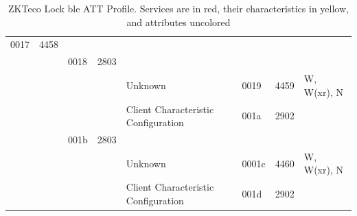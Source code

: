 \documentclass[conference]{IEEEtran}
\begin{document}
\begin{landscape}
\begin{table}[ht]
\begin{tabular}{@{}llllllll@{}}
{\color[HTML]{000000} 0017} & {\color[HTML]{000000} 4458} & {\color[HTML]{000000} }      & {\color[HTML]{000000} }      & {\color[HTML]{000000} }                                                                & {\color[HTML]{000000} }  & {\color[HTML]{000000} }          & {\color[HTML]{000000} }                                                                                            \\
                            &                             & \cellcolor[HTML]{FFFE65}0018 & \cellcolor[HTML]{FFFE65}2803 & \cellcolor[HTML]{FFFE65}                                                               & \cellcolor[HTML]{FFFE65} & \cellcolor[HTML]{FFFE65}         & \cellcolor[HTML]{FFFE65}                                                                                           \\
                            &                             &                              &                              & Unknown                                                                                & 0019                     & 4459                             & W, W(xr), N                                                                                                        \\
                            &                             &                              &                              & Client Characteristic Configuration                                                    & 001a                     & 2902                             &                                                                                                                    \\
                            &                             & \cellcolor[HTML]{FFFE65}001b & \cellcolor[HTML]{FFFE65}2803 & \cellcolor[HTML]{FFFE65}                                                               & \cellcolor[HTML]{FFFE65} & \cellcolor[HTML]{FFFE65}         & \cellcolor[HTML]{FFFE65}                                                                                           \\
                            &                             &                              &                              & Unknown                                                                                & 0001c                    & 4460                             & W, W(xr), N                                                                                                        \\
                            &                             &                              &                              & Client Characteristic Configuration                                                    & 001d                     & 2902                             &                                                                                                                    \\ \bottomrule
\end{tabular}
\caption{ZKTeco Lock \gls{ble} ATT Profile.  Services are in red, their characteristics in yellow, and attributes uncolored}
\label{tab:att}
\end{table}
\end{landscape}
\end{document}
